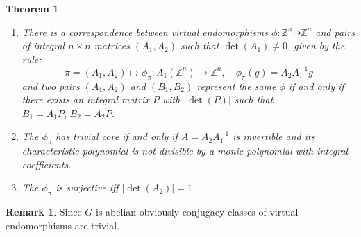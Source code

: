 \documentclass[a4paper,12pt]{amsart}
\newtheorem{theorem}{Theorem}
\theoremstyle{definition}
\newtheorem{remark}{Remark}
\begin{document}
	
	\begin{theorem}\label{theorem: self-similar free abelian} \quad
		  
		\begin{enumerate}[label=\arabic*.]
			
			\item There is a correspondence between virtual endomorphisms $\phi : \mathbb{Z}^n \dashrightarrow \mathbb{Z}^n$ and pairs of integral $n\times n$ matrices $(A_1, A_2)$ such that $\det(A_1) \neq 0$, given by the rule:
			$$
			\pi = (A_1, A_2) \mapsto  \phi_{\pi}: A_1(\mathbb{Z}^n) \rightarrow \mathbb{Z}^n, \quad \phi_\pi (g) = A_2 A_1^{-1} g
			$$
			and two pairs $(A_1, A_2)$ and $(B_1, B_2)$ represent the same $\phi$ if and only if there exists an integral matrix $P$ with $|\det(P)|$ such that $B_1 = A_1 P, \, B_2 = A_2 P$.
			
			\item \label{criterion:free} The $\phi_\pi$ has trivial core if and only if $A = A_2A^{-1}_1$ is invertible and its characteristic polynomial is not divisible by a monic polynomial with integral coefficients. 
			
			
			\item The $\phi_\pi$ is surjective iff $|\det(A_2)| = 1$. 
			
		\end{enumerate}
	\end{theorem}
	
	\begin{remark}
		Since $G$ is abelian obviously conjugacy classes of virtual endomorphisms are trivial. 
	\end{remark}
	
	
	
\end{document}
